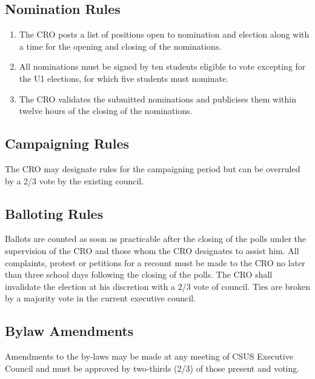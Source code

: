 \subsection{Nomination Rules}\label{nomination-rules}

\begin{enumerate}
\def\labelenumi{\arabic{enumi}.}
\item
  The CRO posts a list of positions open to nomination and election
  along with a time for the opening and closing of the nominations.
\item
  All nominations must be signed by ten students eligible to vote
  excepting for the U1 elections, for which five students must nominate.
\item
  The CRO validates the submitted nominations and publicises them within
  twelve hours of the closing of the nominations.
\end{enumerate}

\subsection{Campaigning Rules}\label{campaigning-rules}

The CRO may designate rules for the campaigning period but can be
overruled by a 2/3 vote by the existing council.

\subsection{Balloting Rules}\label{balloting-rules}

Ballots are counted as soon as practicable after the closing of the
polls under the supervision of the CRO and those whom the CRO designates
to assist him. All complaints, protest or petitions for a recount must
be made to the CRO no later than three school days following the closing
of the polls. The CRO shall invalidate the election at his discretion
with a 2/3 vote of council. Ties are broken by a majority vote in the
current executive council.

\subsection{Bylaw Amendments}\label{bylaw-amendments}

Amendments to the by-laws may be made at any meeting of CSUS Executive
Council and must be approved by two-thirds (2/3) of those present and
voting.

